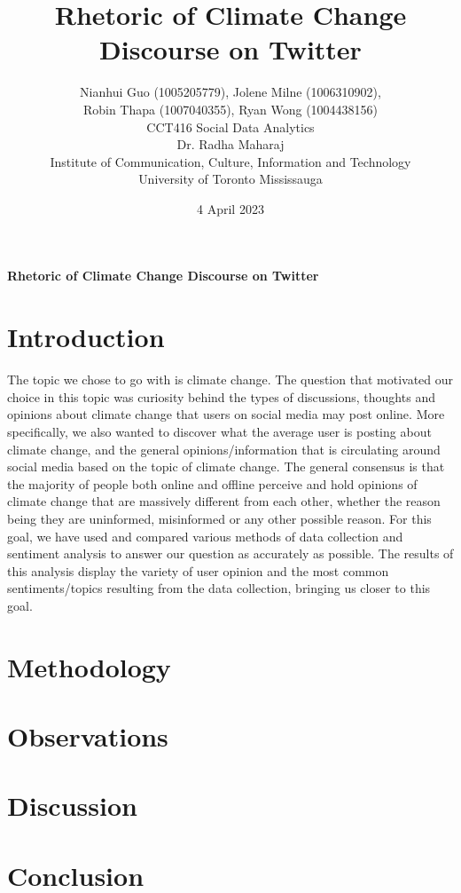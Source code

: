 \documentclass[12pt,titlepage]{article}
\begin{document}
\begin{titlepage}
\title{Rhetoric of Climate Change Discourse on Twitter}
\author{Nianhui Guo (1005205779), Jolene Milne (1006310902),\\
Robin Thapa (1007040355), Ryan Wong (1004438156)\\
CCT416 Social Data Analytics\\
Dr. Radha Maharaj\\
Institute of Communication, Culture, Information and Technology\\
University of Toronto Mississauga\\}
\date{4 April 2023}
\maketitle
\end{titlepage}

\newpage
\tableofcontents
\setcounter{secnumdepth}{0}

\newpage
\begin{center}
    \textbf{\Large Rhetoric of Climate Change Discourse on Twitter}
\end{center}

\section{Introduction}
The topic we chose to go with is climate change. The question that motivated our choice in this topic was curiosity behind the types of discussions, thoughts and opinions about climate change that users on social media may post online. More specifically, we also wanted to discover what the average user is posting about climate change, and the general opinions/information that is circulating around social media based on the topic of climate change. The general consensus is that the majority of people both online and offline perceive and hold opinions of climate change that are massively different from each other, whether the reason being they are uninformed, misinformed or any other possible reason. For this goal, we have used and compared various methods of data collection and sentiment analysis to answer our question as accurately as possible. The results of this analysis display the variety of user opinion and the most common sentiments/topics resulting from the data collection, bringing us closer to this goal.

\newpage
\section{Methodology}


\newpage
\section{Observations}


\newpage
\section{Discussion}


\newpage
\section{Conclusion}


\newpage


\end{document}
